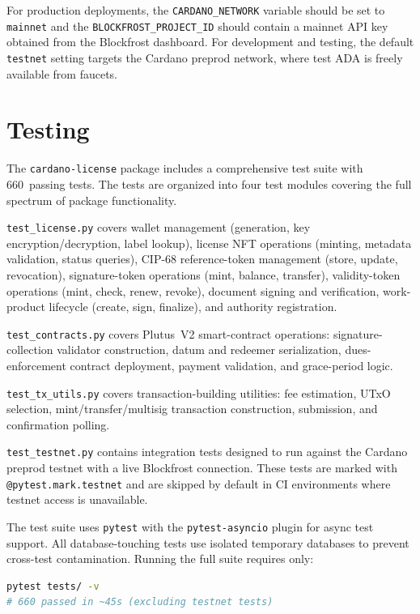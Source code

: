 For production deployments, the \texttt{CARDANO\_NETWORK} variable should be
set to \texttt{mainnet} and the \texttt{BLOCKFROST\_PROJECT\_ID} should
contain a mainnet API key obtained from the Blockfrost dashboard.  For
development and testing, the default \texttt{testnet} setting targets the
Cardano preprod network, where test ADA is freely available from faucets.


\section{Testing}
\label{sec:testing}

The \texttt{cardano-license} package includes a comprehensive test suite
with 660~passing tests.  The tests are organized into four test modules
covering the full spectrum of package functionality.

\texttt{test\_license.py} covers wallet management (generation, key
encryption/decryption, label lookup), license NFT operations (minting,
metadata validation, status queries), CIP-68 reference-token management
(store, update, revocation), signature-token operations (mint, balance,
transfer), validity-token operations (mint, check, renew, revoke), document
signing and verification, work-product lifecycle (create, sign, finalize),
and authority registration.

\texttt{test\_contracts.py} covers Plutus~V2 smart-contract operations:
signature-collection validator construction, datum and redeemer
serialization, dues-enforcement contract deployment, payment validation, and
grace-period logic.

\texttt{test\_tx\_utils.py} covers transaction-building utilities: fee
estimation, UTxO selection, mint/transfer/multisig transaction construction,
submission, and confirmation polling.

\texttt{test\_testnet.py} contains integration tests designed to run against
the Cardano preprod testnet with a live Blockfrost connection.  These tests
are marked with \texttt{@pytest.mark.testnet} and are skipped by default in
CI environments where testnet access is unavailable.

The test suite uses \texttt{pytest} with the \texttt{pytest-asyncio} plugin
for async test support.  All database-touching tests use isolated temporary
databases to prevent cross-test contamination.  Running the full suite
requires only:

\begin{lstlisting}[language=bash, caption={Running the test suite.}]
pytest tests/ -v
# 660 passed in ~45s (excluding testnet tests)
\end{lstlisting}


